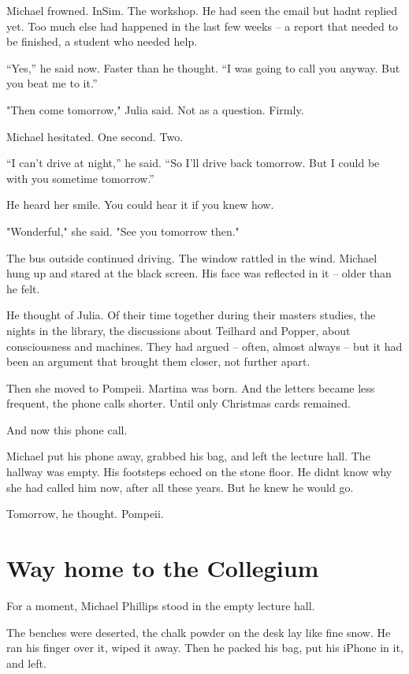 \documentclass[
]{article}
\begin{document}
Michael frowned. InSim. The workshop. He had seen the email but hadn\textquotesingle t replied yet. Too much else had happened in the last few weeks -- a report that needed to be finished, a student who needed help.

``Yes,'' he said now. Faster than he thought. ``I was going to call you anyway. But you beat me to it.''

"Then come tomorrow," Julia said. Not as a question. Firmly.

Michael hesitated. One second. Two.

``I can't drive at night,'' he said. ``So I'll drive back tomorrow. But I could be with you sometime tomorrow.''

He heard her smile. You could hear it if you knew how.

"Wonderful," she said. "See you tomorrow then."

The bus outside continued driving. The window rattled in the wind. Michael hung up and stared at the black screen. His face was reflected in it -- older than he felt.

He thought of Julia. Of their time together during their master\textquotesingle s studies, the nights in the library, the discussions about Teilhard and Popper, about consciousness and machines. They had argued -- often, almost always -- but it had been an argument that brought them closer, not further apart.

Then she moved to Pompeii. Martina was born. And the letters became less frequent, the phone calls shorter. Until only Christmas cards remained.

And now this phone call.

Michael put his phone away, grabbed his bag, and left the lecture hall. The hallway was empty. His footsteps echoed on the stone floor. He didn\textquotesingle t know why she had called him now, after all these years. But he knew he would go.

Tomorrow, he thought. Pompeii.

\section{Way home to the Collegium}\label{way-home-to-the-collegium}

For a moment, Michael Phillips stood in the empty lecture hall.

The benches were deserted, the chalk powder on the desk lay like fine snow. He ran his finger over it, wiped it away. Then he packed his bag, put his iPhone in it, and left.
\end{document}
